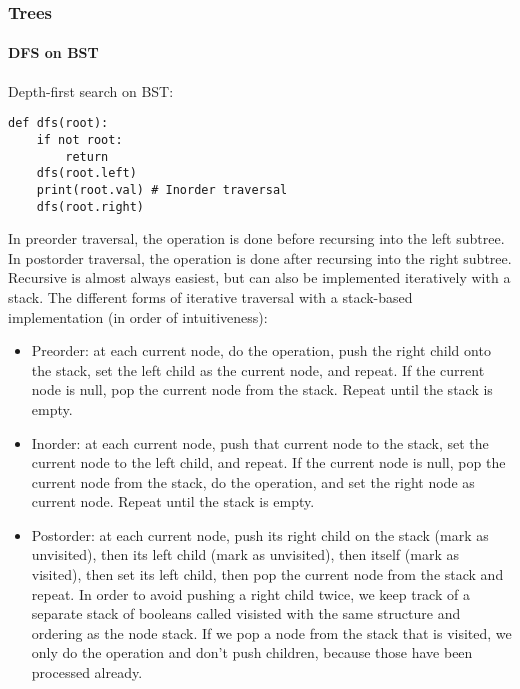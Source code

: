 \documentclass[8pt, table, xcdraw]{article}%
\begin{document}
\subsubsection{Trees}

\paragraph{DFS on BST}

Depth-first search on BST:

\begin{lstlisting}
def dfs(root):
    if not root:
        return    
    dfs(root.left)
    print(root.val) # Inorder traversal
    dfs(root.right)
\end{lstlisting}

In preorder traversal, the operation is done before recursing into the left subtree. In postorder traversal, the operation is done after recursing into the right subtree.\\
Recursive is almost always easiest, but can also be implemented iteratively with a stack. The different forms of iterative traversal with a stack-based implementation (in order of intuitiveness):

\begin{itemize}
    \item Preorder: at each current node, do the operation, push the right child onto the stack, set the left child as the current node, and repeat. If the current node is null, pop the current node from the stack. Repeat until the stack is empty.
    \item Inorder: at each current node, push that current node to the stack, set the current node to the left child, and repeat. If the current node is null, pop the current node from the stack, do the operation, and set the right node as current node. Repeat until the stack is empty.
    \item Postorder: at each current node, push its right child on the stack (mark as unvisited), then its left child (mark as unvisited), then itself (mark as visited), then set its left child, then pop the current node from the stack and repeat. In order to avoid pushing a right child twice, we keep track of a separate stack of booleans called visisted with the same structure and ordering as the node stack. If we pop a node from the stack that is visited, we only do the operation and don't push children, because those have been processed already.
\end{itemize}
\end{document}
